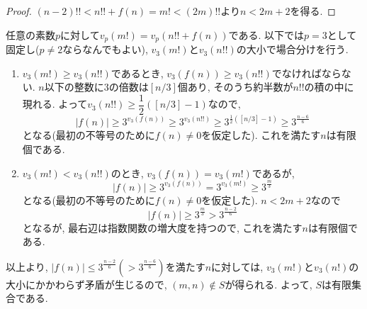 \begin{proof}
    $(n-2)!! < n!! + f(n) = m! < (2m)!!$より$n<2m+2$を得る.
\end{proof}

任意の素数$p$に対して$v_p(m!) = v_{p}(n!! + f(n))$である. 以下では$p=3$として固定し($p\neq 2$ならなんでもよい), $v_3(m!)$と$v_3(n!!)$の大小で場合分けを行う.
\begin{enumerate}
\item $v_3(m!) \geq v_3(n!!)$であるとき, $v_3(f(n)) \geq v_3(n!!)$でなければならない. $n$以下の整数に$3$の倍数は$[n/3]$個あり, そのうち約半数が$n!!$の積の中に現れる. よって$v_3(n!!) \geq \dfrac{1}{2}([n/3] - 1)$なので,
\[
|f(n)| \geq 3^{v_3(f(n))} \geq 3^{v_3(n!!)} \geq 3^{\frac{1}{2}([n/3] - 1)} \geq 3^{\frac{n-6}{6}}
\]
となる(最初の不等号のために$f(n) \neq 0$を仮定した). これを満たす$n$は有限個である.
\item
$v_3(m!) < v_3(n!!)$のとき, $v_3(f(n)) = v_3(m!)$であるが,
\[
|f(n)| \geq 3^{v_3(f(n))} = 3^{v_3(m!)} \geq 3^{\frac{m}{3}}
\]
となる(最初の不等号のために$f(n) \neq 0$を仮定した). %
$n<2m+2$なので
\[
|f(n)| \geq 3^{\frac{m}{3}} > 3^{\frac{n-2}{6}}
\]
となるが, 最右辺は指数関数の増大度を持つので, これを満たす$n$は有限個である.
\end{enumerate}
 以上より, $|f(n)| \leq 3^{\frac{n-2}{6}} ( > 3^{\frac{n-6}{6}})$を満たす$n$に対しては, $v_3(m!)$と$v_3(n!)$の大小にかかわらず矛盾が生じるので, $(m,n)\notin S$が得られる. よって, $S$は有限集合である.
